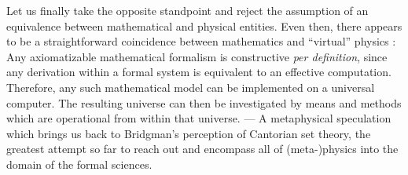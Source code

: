 Let us finally take the opposite standpoint and reject the assumption of
an equivalence
between mathematical and physical entities.
Even then, there appears to be a straightforward coincidence between
mathematics and ``virtual'' physics
\cite{svo-95}:
 Any
axiomatizable mathematical formalism is
constructive {\it per definition}, since any derivation within a formal
system is equivalent to an effective computation. Therefore, any such
mathematical model can be implemented on a universal computer. The
resulting universe can then be investigated by means and methods which
are operational from within that universe. --- A metaphysical
speculation which brings us back to Bridgman's perception of Cantorian
set theory, the greatest attempt so far to reach out and encompass all
of (meta-)physics into the domain of the formal sciences.


